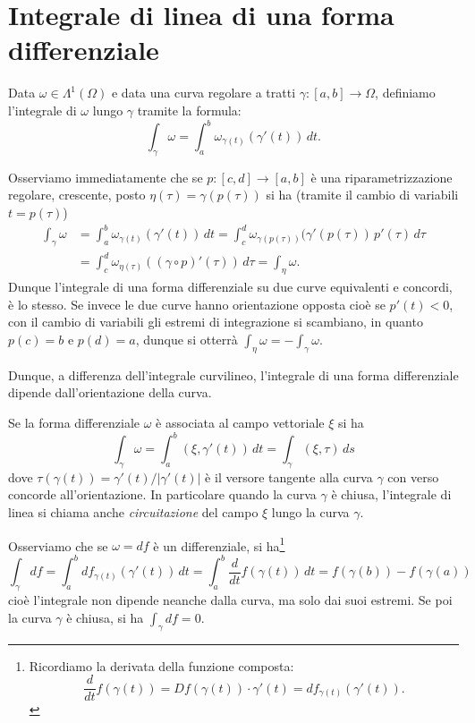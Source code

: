 \documentclass[italian,a4paper]{scrartcl}
\begin{document}
\section{Integrale di linea di una forma differenziale}

Data $\omega\in \Lambda^1(\Omega)$ e data una curva regolare a tratti
$\gamma\colon [a,b]\to \Omega$, definiamo l'integrale di $\omega$
lungo $\gamma$ tramite la formula:
\[
\int_\gamma \omega = \int_a^b \omega_{\gamma(t)}(\gamma'(t))\, dt.
\]

Osserviamo immediatamente che se $p\colon[c,d]\to [a,b]$ è una
riparametrizzazione regolare, crescente, posto $\eta(\tau) =
\gamma(p(\tau))$ si ha (tramite il cambio di variabili $t=p(\tau)$)
\begin{align*}
\int_\gamma \omega
&= \int_a^b \omega_{\gamma(t)}(\gamma'(t))\, d t
= \int_c^d \omega_{\gamma(p(\tau))}(\gamma'(p(\tau))\, p'(\tau)\, d\tau\\
&= \int_c^d \omega_{\eta(\tau)} ((\gamma\circ p)'(\tau))\, d\tau
= \int_\eta \omega.
\end{align*}
Dunque l'integrale di una forma differenziale su due curve equivalenti
e concordi, è lo stesso. Se invece le due curve hanno orientazione
opposta cioè se $p'(t)<0$, con il cambio di variabili gli estremi di
integrazione si scambiano, in quanto $p(c)=b$ e $p(d)=a$, dunque si
otterrà $\int_\eta \omega = - \int_\gamma \omega$.

Dunque, a differenza dell'integrale curvilineo, l'integrale di una
forma differenziale dipende dall'orientazione della curva.

Se la forma differenziale $\omega$ è associata al campo vettoriale
$\xi$ si ha
\[
  \int_\gamma \omega
= \int_a^b (\xi, \gamma'(t))\, dt
= \int_\gamma (\xi, \tau)\, ds
\]
dove $\tau(\gamma(t)) = \gamma'(t) / \lvert \gamma'(t)\rvert$ è
il versore tangente alla curva $\gamma$ con verso concorde
all'orientazione. In particolare quando la curva $\gamma$ è chiusa,
l'integrale di linea si chiama anche
\emph{circuitazione} del campo $\xi$ lungo la curva $\gamma$.

Osserviamo che se $\omega = df$ è un differenziale, si
ha\footnote{Ricordiamo la derivata della funzione composta:
\[
\frac{d}{dt} f(\gamma(t)) = Df(\gamma(t))\cdot \gamma'(t) = df_{\gamma(t)}(\gamma'(t)).
\]}
\[
\int_\gamma df = \int_a^b df_{\gamma(t)}(\gamma'(t))\, dt
= \int_a^b \frac{d}{dt} f(\gamma(t))\, dt = f(\gamma(b)) - f(\gamma(a))
\]
cioè l'integrale non dipende neanche dalla curva, ma solo dai suoi
estremi. Se poi la curva $\gamma$ è chiusa, si ha $\int_\gamma df = 0$.
\end{document}
